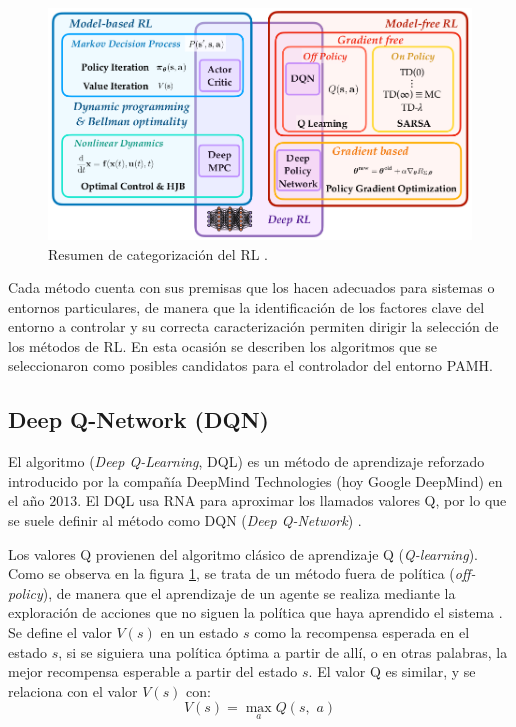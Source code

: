 \begin{figure}[hh]
	\centering
	\includegraphics[scale=0.35]{fig/new/CatRL.png}
	\caption{Resumen de categorización del RL \cite{DataScience}.}
	\label{fig:RLcategorias}
\end{figure}

Cada método cuenta con sus premisas que los hacen adecuados para sistemas o entornos particulares, de manera que la identificación de los factores clave del entorno a controlar y su correcta caracterización permiten dirigir la selección de los métodos de RL. En esta ocasión se describen los algoritmos que se seleccionaron como posibles candidatos para el controlador del entorno PAMH.


\subsection{Deep Q-Network (DQN)}

El algoritmo (\textit{Deep Q-Learning}, DQL) es un método de aprendizaje reforzado introducido por la compañía DeepMind Technologies (hoy Google DeepMind) en el año $2013$. El DQL usa RNA para aproximar los llamados valores Q, por lo que se suele definir al método como DQN (\textit{Deep Q-Network}) \cite{DQNbase}. 

Los valores Q provienen del algoritmo clásico de aprendizaje Q (\textit{Q-learning}). Como se observa en la figura \ref{fig:RLcategorias}, se trata de un método fuera de política (\textit{off-policy}), de manera que el aprendizaje de un agente se realiza mediante la exploración de acciones que no siguen la política que haya aprendido el sistema \cite{DataScience}\cite{DQNexplained}. Se define el valor $V(s)$ en un estado $s$ como la recompensa esperada en el estado $s$, si se siguiera una política óptima a partir de allí, o en otras palabras, la mejor recompensa esperable a partir del estado $s$. El valor Q es similar, y se relaciona con el valor $V(s)$ con:
\begin{equation}
V(s) = \max_a Q(s,\,\, a)
\end{equation}

